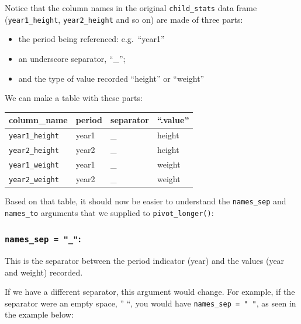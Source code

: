 \documentclass[
  letterpaper,
  DIV=11,
  numbers=noendperiod]{scrreprt}
\begin{document}
Notice that the column names in the original \texttt{child\_stats} data
frame (\texttt{year1\_height}, \texttt{year2\_height} and so on) are
made of three parts:

\begin{itemize}
\item
  the period being referenced: e.g.~``year1''
\item
  an underscore separator, ``\_'';
\item
  and the type of value recorded ``height'' or ``weight''
\end{itemize}

We can make a table with these parts:

\begin{longtable}[]{@{}llll@{}}
\toprule\noalign{}
column\_name & period & separator & ``.value'' \\
\midrule\noalign{}
\endhead
\bottomrule\noalign{}
\endlastfoot
\texttt{year1\_height} & year1 & \_ & height \\
\texttt{year2\_height} & year2 & \_ & height \\
\texttt{year1\_weight} & year1 & \_ & weight \\
\texttt{year2\_weight} & year2 & \_ & weight \\
\end{longtable}

Based on that table, it should now be easier to understand the
\texttt{names\_sep} and \texttt{names\_to} arguments that we supplied to
\texttt{pivot\_longer()}:

\hypertarget{names_sep-_}{%
\subsubsection{\texorpdfstring{\texttt{names\_sep\ =\ "\_"}:}{names\_sep = "\_":}}\label{names_sep-_}}

This is the separator between the period indicator (year) and the values
(year and weight) recorded.

If we have a different separator, this argument would change. For
example, if the separator were an empty space, '' ``, you would have
\texttt{names\_sep\ =\ "\ "}, as seen in the example below:
\end{document}
